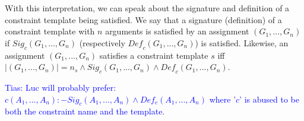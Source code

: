 \documentclass{sig-alternate-05-2015}
\newcommand{\sergey}[1]{\textcolor{magenta}{{\sc Sergey:} #1}\xspace}
\newcommand{\samuel}[1]{\textcolor{green}{{\sc Samuel:} #1}\xspace}
\newcommand{\tias}[1]{\textcolor{blue}{{\sc Tias:} #1}\xspace}
\newcommand{\format}[1]{\textit{#1}\xspace}
\newcommand{\range}[3]{\ensuremath{#1[#2,#3]}}
\newcommand{\rangeall}{:}
\begin{document}
\newcommand{\sigc}{\ensuremath{\format{Sig}_c}}
\newcommand{\defc}{\ensuremath{\format{Def}_c}}

With this interpretation, we can speak about the signature and definition of a constraint template being satisfied. We say that a signature (definition) of a constraint template with $n$ arguments is satisfied by an assignment $(G_1, ..., G_n)$ if $\sigc(G_1, ..., G_n)$ (respectively $\defc(G_1, ..., G_n)$) is satisfied. Likewise, an assignment $(G_1, ..., G_n)$ satisfies a constraint template $s$ iff $|(G_1, ..., G_n)| = n_s \wedge \sigc(G_1, ..., G_n) \wedge \defc(G_1, ..., G_n)$.

\tias{Luc will probably prefer: $c(A_1, ..., A_n) :- Sig_c(A_1, ..., A_n) \wedge Def_c(A_1, ..., A_n)$ where '$c$' is abused to be both the constraint name and the template}.


\end{document}
